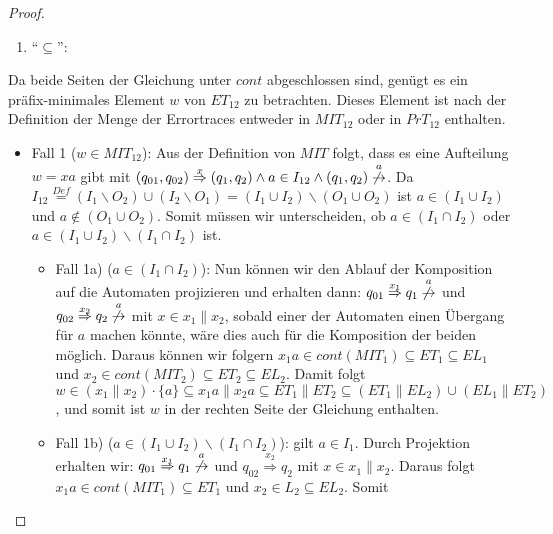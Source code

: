 \begin{proof}
  ~
  \begin{enumerate}
    \item ``$\subseteq$'':
  \end{enumerate}
  Da beide Seiten der Gleichung unter $cont$ abgeschlossen sind, genügt es ein
  präfix-minimales Element $w$ von $ET_{12}$ zu betrachten. Dieses Element ist
  nach der Definition der Menge der Errortraces entweder in $MIT_{12}$ oder in
  $PrT_{12}$ enthalten.\\
  \begin{itemize}
    \item Fall 1 ($w\in MIT_{12}$): Aus der Definition von $MIT$ folgt, dass es eine
  Aufteilung $w=xa$ gibt mit
  $(q_{01},q_{02})\overset{x}{\Rightarrow}(q_1,q_2)\wedge a\in I_{12}\wedge
  (q_1,q_2)\overset{a}{\not{\hspace{-0.1cm}\rightarrow}}$. Da
  $I_{12}\overset{Def}{=}(I_1\backslash O_2)\cup (I_2\backslash O_1)=(I_1\cup
  I_2)\backslash (O_1\cup O_2)$ ist $a\in (I_1\cup I_2)$ und $a\notin (O_1\cup
  O_2)$. Somit müssen wir unterscheiden, ob $a\in (I_1\cap I_2)$ oder $a\in
  (I_1\cup I_2)\backslash (I_1\cap I_2)$ ist.
  \begin{itemize}
    \item Fall 1a) ($a\in (I_1\cap I_2)$): Nun können wir den Ablauf der Komposition
  auf die Automaten projizieren und erhalten dann:
  $q_{01}\overset{x_1}{\Rightarrow} q_1
  \overset{a}{\not{\hspace{-0.1cm}\rightarrow}}$ und
  $q_{02}\overset{x_2}{\Rightarrow} q_2
  \overset{a}{\not{\hspace{-0.1cm}\rightarrow}}$ mit $x\in x_1\|x_2$, sobald einer der Automaten
  einen Übergang für $a$ machen könnte, wäre dies auch für die Komposition der
  beiden möglich. Daraus können wir folgern $x_1a\in cont(MIT_1)\subseteq
  ET_1\subseteq EL_1$ und $x_2\in cont(MIT_2)\subseteq ET_2\subseteq EL_2$.
  Damit folgt $w\in (x_1\|x_2)\cdot\{a\}\subseteq x_1a\|x_2a\subseteq
  ET_1\|ET_2\subseteq (ET_1\|EL_2)\cup(EL_1\|ET_2)$, und somit ist $w$ in der
  rechten Seite der Gleichung enthalten.
\item Fall 1b) ($a\in (I_1\cup I_2)\backslash(I_1\cap I_2)$): \oBdA{} gilt
      $a\in I_1$. Durch Projektion erhalten wir:
      $q_{01}\overset{x_1}{\Rightarrow} q_1
      \overset{a}{\not{\hspace{-0.1cm}\rightarrow}}$ und
      $q_{02}\overset{x_2}{\Rightarrow} q_2$ mit $x\in x_1\|x_2$. Daraus folgt
      $x_1a\in cont(MIT_1)\subseteq ET_1$ und $x_2\in L_2\subseteq EL_2$. Somit

\end{itemize}
\end{itemize}
\end{proof}
